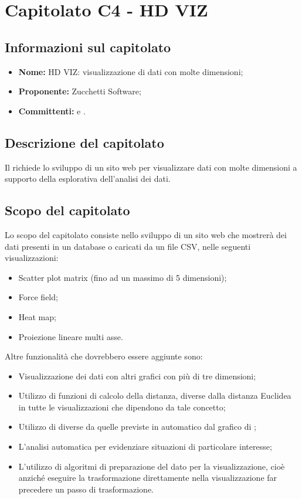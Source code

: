 \section{Capitolato C4 - HD VIZ}\label{C4}
\subsection{Informazioni sul capitolato}
\begin{itemize}
	\item \textbf{Nome:} HD VIZ: visualizzazione di dati con molte dimensioni;
	\item \textbf{Proponente:} Zucchetti Software;
	\item \textbf{Committenti:} \VT{} e \CR{}.
\end{itemize}

\subsection{Descrizione del capitolato}
Il  richiede lo sviluppo di un sito web per visualizzare dati con molte dimensioni a supporto della  esplorativa dell'analisi dei dati.

\subsection{Scopo del capitolato}
Lo scopo del capitolato consiste nello sviluppo di un sito web che mostrerà dei dati presenti in un database o caricati da un file CSV, nelle seguenti visualizzazioni:
\begin{itemize}
	\item Scatter plot matrix (fino ad un massimo di 5 dimensioni);
	\item Force field;
	\item Heat map;
	\item Proiezione lineare multi asse.
\end{itemize}
Altre funzionalità che dovrebbero essere aggiunte sono:
\begin{itemize}
	\item Visualizzazione dei dati con altri grafici con più di tre dimensioni;
	\item Utilizzo di funzioni di calcolo della distanza, diverse dalla distanza Euclidea in tutte le visualizzazioni che dipendono da tale concetto;
	\item Utilizzo di  diverse da quelle previste in automatico dal grafico  di ;
	\item L'analisi automatica per evidenziare situazioni di particolare interesse;
	\item L'utilizzo di algoritmi di preparazione del dato per la visualizzazione, cioè anziché eseguire la trasformazione direttamente nella visualizzazione far precedere un passo di trasformazione.
\end{itemize}

